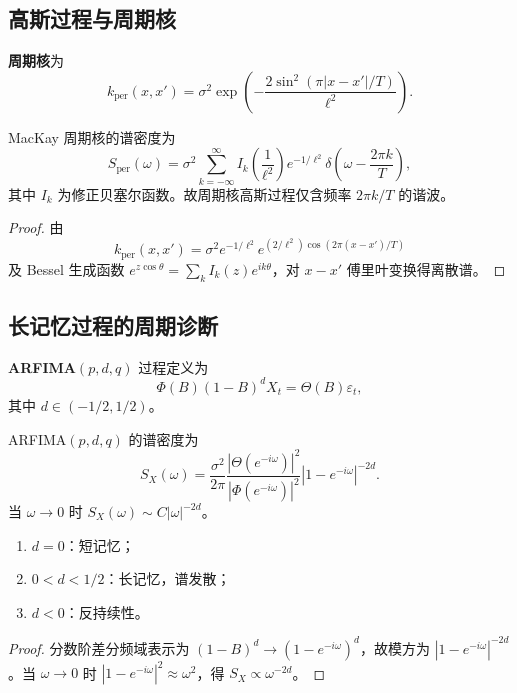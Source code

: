 \subsection{高斯过程与周期核}

\begin{definition}[周期核]\label{def:periodic_kernel}
\textbf{周期核}为
\[
k_{\mathrm{per}}(x,x')=\sigma^2\exp\left(-\frac{2\sin^2(\pi|x-x'|/T)}{\ell^2}\right).
\]
\end{definition}

\begin{proposition}[周期核的谱密度]\label{prop:gp_spectrum}
MacKay 周期核的谱密度为
\[
S_{\mathrm{per}}(\omega)=\sigma^2\sum_{k=-\infty}^{\infty}I_k\left(\frac1{\ell^2}\right)e^{-1/\ell^2}\delta\left(\omega-\frac{2\pi k}{T}\right),
\]
其中 $I_k$ 为修正贝塞尔函数。故周期核高斯过程仅含频率 $2\pi k/T$ 的谐波。
\end{proposition}

\begin{proof}
由
\[
k_{\mathrm{per}}(x,x')=\sigma^2e^{-1/\ell^2}e^{(2/\ell^2)\cos(2\pi(x-x')/T)}
\]
及 Bessel 生成函数 $e^{z\cos\theta}=\sum_kI_k(z)e^{ik\theta}$，对 $x-x'$ 傅里叶变换得离散谱。
\end{proof}

\subsection{长记忆过程的周期诊断}

\begin{definition}[ARFIMA 过程]\label{def:arfima}
\textbf{ARFIMA}$(p,d,q)$ 过程定义为
\[
\Phi(B)(1-B)^dX_t=\Theta(B)\varepsilon_t,
\]
其中 $d\in(-1/2,1/2)$。
\end{definition}

\begin{proposition}\label{prop:arfima_spectrum}
ARFIMA$(p,d,q)$ 的谱密度为
\[
S_X(\omega)=\frac{\sigma^2}{2\pi}\frac{|\Theta(e^{-i\omega})|^2}{|\Phi(e^{-i\omega})|^2}|1-e^{-i\omega}|^{-2d}.
\]
当 $\omega\to0$ 时 $S_X(\omega)\sim C|\omega|^{-2d}$。
\begin{enumerate}[label=(\roman*)]
    \item $d=0$：短记忆；
    \item $0<d<1/2$：长记忆，谱发散；
    \item $d<0$：反持续性。
\end{enumerate}
\end{proposition}

\begin{proof}
分数阶差分频域表示为 $(1-B)^d\to(1-e^{-i\omega})^d$，故模方为 $|1-e^{-i\omega}|^{-2d}$。当 $\omega\to0$ 时 $|1-e^{-i\omega}|^2\approx\omega^2$，得 $S_X\propto\omega^{-2d}$。
\end{proof}

